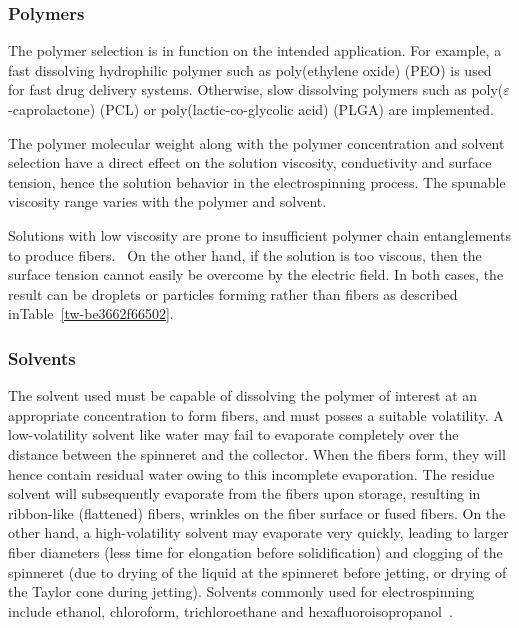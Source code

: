 \documentclass[5p,,preprint,12pt,twocolumn]{elsarticle}
\begin{document}
\subsubsection{Polymers}The polymer selection is in function on the intended application. For example, a fast dissolving hydrophilic polymer such as poly(ethylene oxide) (PEO) is used for fast drug delivery systems. Otherwise, slow dissolving polymers such as poly($\varepsilon $-caprolactone) (PCL) or poly(lactic-co-glycolic acid) (PLGA) are implemented. \unskip~\cite{527120:13082763}

The polymer molecular weight along with the polymer concentration and solvent selection have a direct effect on the solution viscosity, conductivity and surface tension, hence the solution behavior in the electrospinning process. The spunable viscosity range varies with the polymer and solvent. 

Solutions with low viscosity are prone to insufficient polymer chain entanglements to produce fibers.\unskip~\cite{527120:13082763} On the other hand, if the solution is too viscous, then the surface tension cannot easily be overcome by the electric field. In both cases, the result can be droplets or particles forming rather than fibers as described inTable~\ref{tw-be3662f66502}.



\subsubsection{Solvents}The solvent used must be capable of dissolving the polymer of interest at an appropriate concentration to form fibers, and must posses a suitable volatility. A low-volatility solvent like water may fail to evaporate completely over the distance between the spinneret and the collector. When the fibers form, they will hence contain residual water owing to this incomplete evaporation. The residue solvent will subsequently evaporate from the fibers upon storage, resulting in ribbon-like (flattened) fibers, wrinkles on the fiber surface or fused fibers. On the other hand, a high-volatility solvent may evaporate very quickly, leading to larger fiber diameters (less time for elongation before solidification) and clogging of the spinneret (due to drying of the liquid at the spinneret before jetting, or drying of the Taylor cone during jetting). Solvents commonly used for electrospinning include ethanol, chloroform, trichloroethane and hexafluoroisopropanol\unskip~\cite{527120:12073495,527120:16887323,527120:16887324}.
\end{document}
